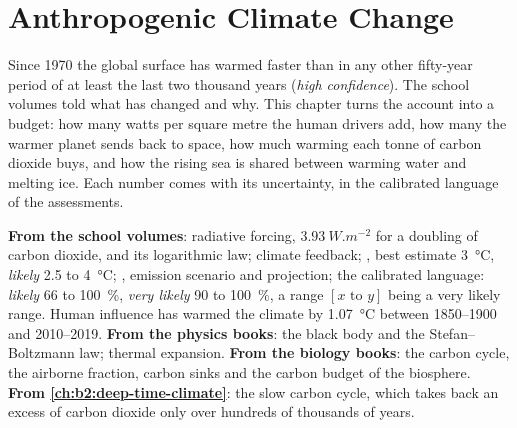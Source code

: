 \chapter{Anthropogenic Climate Change}\label{ch:b2:anthropogenic-climate-change}

Since 1970 the global surface has warmed faster than in any other fifty-year period of at least
the last two thousand years (\emph{high confidence}). The school volumes told what has changed and
why. This chapter turns the account into a budget: how many watts per square metre the human
drivers add, how many the warmer planet sends back to space, how much warming each tonne of carbon
dioxide buys, and how the rising sea is shared between warming water and melting ice. Each number
comes with its uncertainty, in the calibrated language of the assessments.

\begin{recall}
\textbf{From the school volumes}: radiative forcing, $\qty{3.93}{W.m^{-2}}$ for a doubling of
carbon dioxide, and its logarithmic law; climate feedback; , best
estimate \qty{3}{\celsius}, \emph{likely} 2.5 to \qty{4}{\celsius}; , emission scenario
and projection; the calibrated language: \emph{likely} 66 to \qty{100}{\percent}, \emph{very
likely} 90 to \qty{100}{\percent}, a range $[x \text{ to } y]$ being a very likely range. Human
influence has warmed the climate by \qty{1.07}{\celsius} between 1850--1900 and 2010--2019.
\textbf{From the physics books}: the black body and the Stefan--Boltzmann law; thermal expansion.
\textbf{From the biology books}: the carbon cycle, the airborne fraction, carbon sinks and the
carbon budget of the biosphere. \textbf{From \cref{ch:b2:deep-time-climate}}: the slow carbon cycle,
which takes back an excess of carbon dioxide only over hundreds of thousands of years.
\end{recall}

